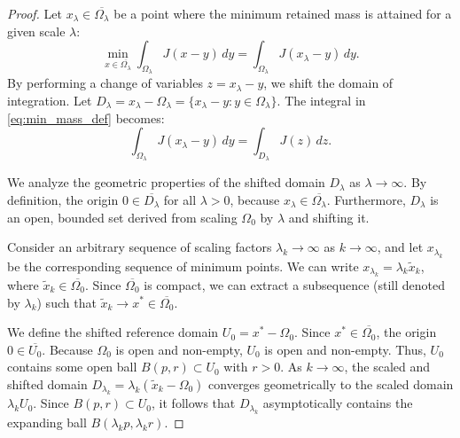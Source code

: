 \documentclass[11pt, a4paper]{article}
\theoremstyle{break}
\theoremstyle{break}
\theoremstyle{break}
\theoremstyle{break}
\theoremstyle{break}
\theoremstyle{break}
\theoremstyle{break}
\theoremstyle{break}
\theoremstyle{break}
\begin{document}
\begin{proof}
Let $x_\lambda \in \overline{\Omega_\lambda}$ be a point where the minimum retained mass is attained for a given scale $\lambda$:
\begin{equation} \label{eq:min_mass_def}
    \min_{x \in \overline{\Omega_\lambda}} \int_{\Omega_\lambda} J(x-y) \, dy = \int_{\Omega_\lambda} J(x_\lambda - y) \, dy.
\end{equation}
By performing a change of variables $z = x_\lambda - y$, we shift the domain of integration. Let $D_\lambda = x_\lambda - \Omega_\lambda = \{ x_\lambda - y : y \in \Omega_\lambda \}$. The integral in \eqref{eq:min_mass_def} becomes:
\begin{equation}
    \int_{\Omega_\lambda} J(x_\lambda - y) \, dy = \int_{D_\lambda} J(z) \, dz.
\end{equation}

We analyze the geometric properties of the shifted domain $D_\lambda$ as $\lambda \to \infty$. By definition, the origin $0 \in \overline{D_\lambda}$ for all $\lambda > 0$, because $x_\lambda \in \overline{\Omega_\lambda}$. Furthermore, $D_\lambda$ is an open, bounded set derived from scaling $\Omega_0$ by $\lambda$ and shifting it. 

Consider an arbitrary sequence of scaling factors $\lambda_k \to \infty$ as $k \to \infty$, and let $x_{\lambda_k}$ be the corresponding sequence of minimum points. We can write $x_{\lambda_k} = \lambda_k \tilde{x}_k$, where $\tilde{x}_k \in \overline{\Omega_0}$. Since $\overline{\Omega_0}$ is compact, we can extract a subsequence (still denoted by $\lambda_k$) such that $\tilde{x}_k \to x^* \in \overline{\Omega_0}$.

We define the shifted reference domain $U_0 = x^* - \Omega_0$. Since $x^* \in \overline{\Omega_0}$, the origin $0 \in \overline{U_0}$. Because $\Omega_0$ is open and non-empty, $U_0$ is open and non-empty. Thus, $U_0$ contains some open ball $B(p, r) \subset U_0$ with $r > 0$. As $k \to \infty$, the scaled and shifted domain $D_{\lambda_k} = \lambda_k (\tilde{x}_k - \Omega_0)$ converges geometrically to the scaled domain $\lambda_k U_0$. Since $B(p, r) \subset U_0$, it follows that $D_{\lambda_k}$ asymptotically contains the expanding ball $B(\lambda_k p, \lambda_k r)$.


\end{proof}
\end{document}

